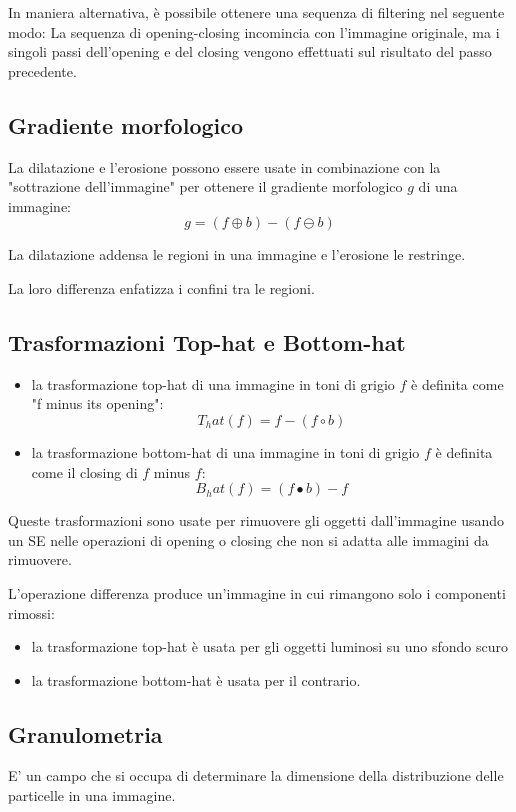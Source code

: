 In maniera alternativa, è possibile ottenere una sequenza di filtering nel seguente modo:
La sequenza di opening-closing incomincia con l'immagine originale, ma i singoli passi dell'opening e del closing vengono effettuati sul risultato del passo precedente.

\subsection{Gradiente morfologico}
La dilatazione e l'erosione possono essere usate in combinazione con la "sottrazione dell'immagine" per ottenere il gradiente morfologico $g$ di una immagine:
$$
g = (f \oplus b) - (f \ominus b)
$$

La dilatazione addensa le regioni in una immagine e l'erosione le restringe.

La loro differenza enfatizza i confini tra le regioni.

\subsection{Trasformazioni Top-hat e Bottom-hat}
\begin{itemize}
	\item la trasformazione top-hat di una immagine in toni di grigio $f$ è definita come "f minus its opening":
	$$
	T_hat(f) = f - (f \circ b)
	$$
	
	\item la trasformazione bottom-hat di una immagine in toni di grigio $f$ è definita come il closing di $f$ minus $f$:
	$$
	B_hat(f) = (f \bullet b) - f
	$$
\end{itemize}

Queste trasformazioni sono usate per rimuovere gli oggetti dall'immagine usando un SE nelle operazioni di opening o closing che non si adatta alle immagini da rimuovere.

L'operazione differenza produce un'immagine in cui rimangono solo i componenti rimossi:
\begin{itemize}
	\item la trasformazione top-hat è usata per gli oggetti luminosi su uno sfondo scuro
	\item la trasformazione bottom-hat è usata per il contrario.
\end{itemize}

\subsection{Granulometria}
E' un campo che si occupa di determinare la dimensione della distribuzione delle particelle in una immagine.

